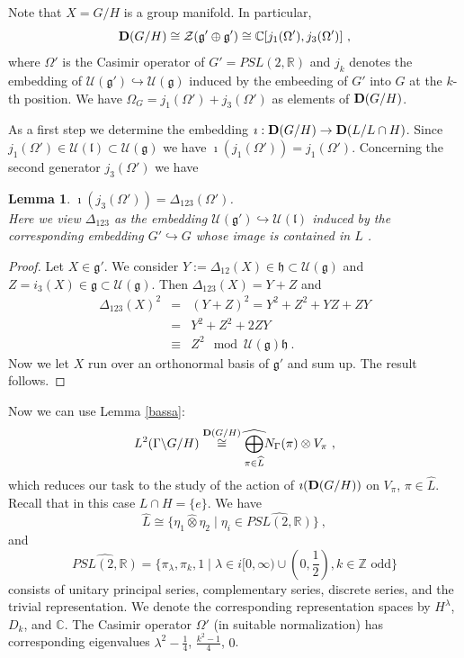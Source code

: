 \documentclass[10]{amsart}
\newtheorem{lem}[thm]{Lemma}
\theoremstyle{remark}
\theoremstyle{definition}
\numberwithin{equation}{section}
\newcommand{\C}{\mathbb{C}}           %
\newcommand{\fg}{{\mathfrak g}}
\newcommand{\fh}{{\mathfrak h}}
\newcommand{\fl}{{\mathfrak l}}
\newcommand{\Cal}{\mathcal}
\newcommand{\be}{\begin{equation}}
\begin{document}
{Note that $X=G/H$ is a group manifold. In particular,
$$ {\bf D}(G/H)\cong{\Cal Z}(\fg'\oplus\fg')\cong \mathbb{C} [j_1(\Omega'),j_3(\Omega')]\ ,$$
where $\Omega'$ is the Casimir operator of $G'=PSL(2,\mathbb{R})$ and $j_k$ denotes the embedding of  ${\Cal U}(\fg ')\hookrightarrow {\Cal U}(\fg)$ induced by the embeeding
of $G'$ into $G$ at the $k$-th position. We have $\Omega_G= j_1(\Omega')+j_3(\Omega')$ as elements of ${\bf D}(G/H)$.

As a first step we determine the embedding $\imath: {\bf D}(G/H)\rightarrow {\bf D}(L/L\cap H)$. Since $j_1(\Omega')\in{\Cal U}(\fl)\subset{\Cal U}(\fg)$ we have $\imath(j_1(\Omega'))=j_1(\Omega')$.
Concerning the second generator $j_3(\Omega')$ we have

\begin{lem}\label{bur}$ \imath(j_3(\Omega'))=\Delta_{123}(\Omega')$.\\
 Here we view $\Delta_{123}$ as the embedding ${\Cal U}(\fg ')\hookrightarrow {\Cal U}(\fl)$ induced by the corresponding embedding $G'\hookrightarrow G$ whose image is contained in $L$ .
\end{lem} 

\begin{proof} Let $X\in\fg'$. We consider $Y:=\Delta_{12}(X)\in \fh\subset {\Cal U}(\fg)$ and $Z=i_3(X)\in \fg\subset {\Cal U}(\fg)$. Then $\Delta_{123}(X)=Y+Z$ and
\begin{eqnarray*}\Delta_{123}(X)^2&=&(Y+Z)^2=Y^2+Z^2+YZ+ZY\\
&=&Y^2+Z^2+2ZY\\
&\equiv& Z^2 \mod {\Cal U}(\fg)\fh\ .
\end{eqnarray*}
Now we let $X$ run over an orthonormal basis of $\fg'$ and sum up. The result follows.
\end{proof} 
Now we can use Lemma \ref{bassa}:
\be\label{bor} L^2(\Gamma\backslash G/H)\stackrel{{\bf D}(G/H)}{\cong} \widehat{\bigoplus_{\pi\in\widehat L}} N_\Gamma(\pi)\otimes V_\pi\ ,
\end{equation}
which reduces our task to the study of the action of  $\imath ({\bf D}(G/H))$ on $V_\pi$, $\pi\in \widehat L$. Recall that in this case $L\cap H=\{e\}$. We have
$$ \widehat L\cong \{\eta_1\hat\otimes \eta_2\mid \eta_i\in\widehat{PSL(2,\mathbb{R})}\}\ ,$$
and
$$ \widehat{PSL(2,\mathbb{R})}=\{\pi_\lambda, \pi_k, 1\mid \lambda\in i[0,\infty)\cup(0,\frac{1}{2}), k\in\mathbb{Z}  \mbox{ odd}\}$$
consists of unitary principal series, complementary series, discrete series, and the trivial representation. We denote the corresponding representation spaces by $H^\lambda$, $D_k$, and 
$\C$.
The Casimir operator $\Omega'$ (in suitable normalization) has corresponding eigenvalues $\lambda^2-\frac{1}{4}$, $\frac{k^2-1}{4}$, $0$.

}
\end{document}
